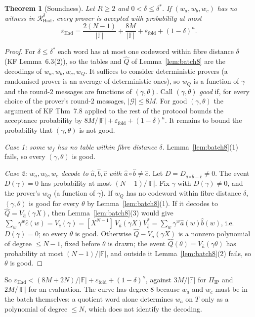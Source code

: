 \documentclass[11pt]{article}
\newtheorem{theorem}{Theorem}
\theoremstyle{definition}
\newcommand{\F}{\mathbb{F}}
\newcommand{\coef}[2]{[X^{#1}]\,#2}
\begin{document}
\begin{theorem}[Soundness]\label{thm:had}
Let $R\ge2$ and $0<\delta\le\delta^\ast$. If $(w_a,w_b,w_c)$ has no witness in $\mathcal R^\delta_{\mathrm{Had}}$, every prover is accepted with probability at most
\[
\varepsilon_{\mathrm{Had}}=\frac{2(N-1)}{|\F|}+\frac{8M}{|\F|}+\varepsilon_{\mathrm{fold}}+(1-\delta)^\kappa .
\]
\end{theorem}
\begin{proof}
For $\delta\le\delta^\ast$ each word has at most one codeword within fibre distance $\delta$ (KF Lemma~6.3(2)), so the tables and $\hat Q$ of Lemma~\ref{lem:batch8} are the decodings of $w_a,w_b,w_c,w_Q$.
It suffices to consider deterministic provers (a randomised prover is an average of deterministic ones), so $w_Q$ is a function of $\gamma$ and the round-$2$ messages are functions of $(\gamma,\theta)$.
Call $(\gamma,\theta)$ \emph{good} if, for every choice of the prover's round-$2$ messages, $|\mathcal G|\le8M$. For good $(\gamma,\theta)$ the argument of KF Thm~7.8 applied to the rest of the protocol bounds the acceptance probability by $8M/|\F|+\varepsilon_{\mathrm{fold}}+(1-\delta)^\kappa$. It remains to bound the probability that $(\gamma,\theta)$ is not good.

\emph{Case 1: some $w_f$ has no table within fibre distance $\delta$.} Lemma~\ref{lem:batch8}(1) fails, so every $(\gamma,\theta)$ is good.

\emph{Case 2: $w_a,w_b,w_c$ decode to $\hat a,\hat b,\hat c$ with $\hat a\circ\hat b\ne\hat c$.}
Let $D=D_{\hat a\circ\hat b-\hat c}\ne0$. The event $D(\gamma)=0$ has probability at most $(N-1)/|\F|$. Fix $\gamma$ with $D(\gamma)\ne0$, and the prover's $w_Q$ (a function of $\gamma$).
If $w_Q$ has no codeword within fibre distance $\delta$, $(\gamma,\theta)$ is good for every $\theta$ by Lemma~\ref{lem:batch8}(1).
If it decodes to $\hat Q=V_{\hat a}(\gamma X)$, then Lemma~\ref{lem:batch8}(3) would give $\sum_w\gamma^w\hat c(w)=V_{\hat c}(\gamma)=\coef{N-1}{V_{\hat a}(\gamma X)V_{\hat b}^\ast}=\sum_w\gamma^w\hat a(w)\hat b(w)$, i.e.\ $D(\gamma)=0$; so every $\theta$ is good.
Otherwise $\hat Q-V_{\hat a}(\gamma X)$ is a nonzero polynomial of degree $\le N-1$, fixed before $\theta$ is drawn; the event $\hat Q(\theta)=V_{\hat a}(\gamma\theta)$ has probability at most $(N-1)/|\F|$, and outside it Lemma~\ref{lem:batch8}(2) fails, so $\theta$ is good.
\end{proof}

So $\varepsilon_{\mathrm{Had}}<(8M+2N)/|\F|+\varepsilon_{\mathrm{fold}}+(1-\delta)^\kappa$, against $3M/|\F|$ for $\Pi_{\mathrm{IP}}$ and $2M/|\F|$ for an evaluation.
The curve has degree $8$ because $w_a$ and $w_c$ must be in the batch themselves: a quotient word alone determines $w_a$ on $T$ only as a polynomial of degree $\le N$, which does not identify the decoding.
\end{document}
